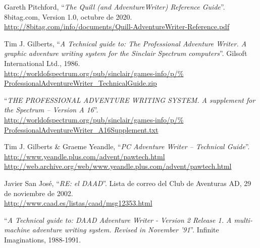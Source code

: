 \documentclass[11pt, a5paper]{article}
\begin{document}
\begin{thebibliography}{99}
  Gareth Pitchford,
  ``\emph{The Quill (and AdventureWriter) Reference Guide}''.
  8bitag.com,
  Version 1.0,
  octubre de 2020.\\
  \url{http://8bitag.com/info/documents/Quill-AdventureWriter-Reference.pdf}

  Tim J. Gilberts,
  ``\emph{A Technical guide to: The Professional Adventure Writer. A graphic
  adventure writing system for the Sinclair Spectrum computers}''.
  Gilsoft International Ltd.,
  1986.\\
  \url{http://worldofspectrum.org/pub/sinclair/games-info/p/%
       ProfessionalAdventureWriter_TechnicalGuide.zip}

  ``\emph{THE PROFESSIONAL ADVENTURE WRITING SYSTEM. A supplement for the
  Spectrum -- Version A 16}''.\\
  \url{http://worldofspectrum.org/pub/sinclair/games-info/p/%
       ProfessionalAdventureWriter_A16Supplement.txt}

  Tim J. Gilberts \& Graeme Yeandle,
  ``\emph{PC Adventure Writer -- Technical Guide}''.\\
  \url{http://www.yeandle.plus.com/advent/pawtech.html}\\
  \url{http://web.archive.org/web/www.yeandle.plus.com/advent/pawtech.html}

  Javier San José,
  ``\emph{RE: el DAAD}''.
  Lista de correo del Club de Aventuras AD,
  29 de noviembre de 2002.\\
  \url{http://www.caad.es/listas/caad/msg12353.html}

  ``\emph{A Technical guide to: DAAD Adventure Writer - Version 2 Release 1. A multi-machine adventure writing system. Revised in November '91}''.
  Infinite Imaginations,
  1988-1991.

\end{thebibliography}
\end{document}
